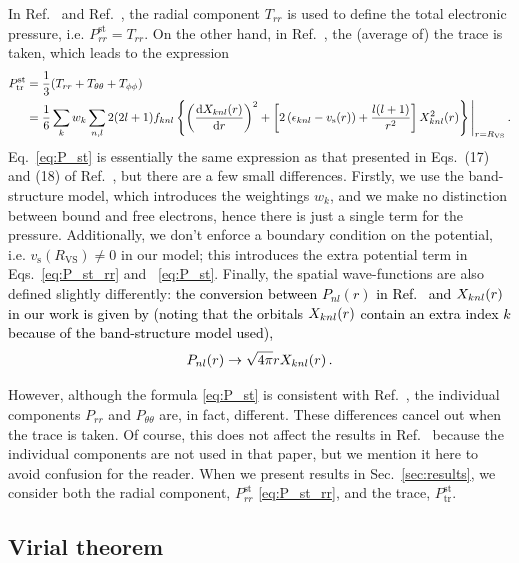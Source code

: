 \documentclass[%
 preprint,
 superscriptaddress,
 amsmath,amssymb,
longbibliography,
]{revtex4-2}
\newcommand{\vs}{v_\textrm{s}}
\newcommand{\RWS}{R_\textrm{VS}}
\newcommand{\change}[1]{\textcolor{black}{#1}}
\newcommand{\Pstrr}{P^\textrm{st}_{rr}}
\newcommand{\Psttr}{P^\textrm{st}_\textrm{tr}}
\begin{document}
In Ref.~\cite{stress_tensor_more} and Ref.~\cite{Pain_virial}, the radial component $T_{rr}$ is used to define the total electronic pressure, i.e. $\Pstrr= T_{rr}$. On the other hand, in Ref.~\cite{Pressure_warm_hot}, the (average of) the trace is taken, which leads to the expression
\begin{align}
    \Psttr &= \frac{1}{3}(T_{rr} + T_{\theta\theta} + T_{\phi\phi})\\
    \label{eq:P_st}
    &= \frac{1}{6}\sum_k w_k \sum_{n,l} 2(2l+1) f_{knl} \left\{ \left(\dv{\rnl}{r}\right)^2 + \left[2\left(\epsilon_{knl} - \vs(r) \right) +\frac{l(l+1)}{r^2}\right] X_{knl}^2 (r)\right\}\Bigg|_{r=\RWS}\,.
\end{align}
Eq.~\eqref{eq:P_st} is essentially the same expression as that presented in Eqs.~(17) and (18) of Ref.~\cite{Pressure_warm_hot}, but there are a few small differences. Firstly, we use the band-structure model, which introduces the weightings $w_k$, and we make no distinction between bound and free electrons, hence there is just a single term for the pressure. Additionally, we don't enforce a boundary condition on the potential, i.e. $\vs(\RWS)\neq0$ in our model; this introduces the extra potential term in Eqs.~\eqref{eq:P_st_rr} and ~\eqref{eq:P_st}. Finally, the spatial wave-functions are also defined slightly differently: \change{the conversion between $P_{nl}(r)$ in Ref.~\cite{Pressure_warm_hot} and $\rnl$ in our work is given by (noting that the orbitals $\rnl$ contain an extra index $k$ because of the band-structure model used),
\begin{equation}
    P_{nl}(r) \rightarrow \sqrt{4\pi} r \rnl\,.
\end{equation}}

However, although the formula \eqref{eq:P_st} is consistent with Ref.~\cite{Pressure_warm_hot}, the individual components $P_{rr}$ and $P_{\theta\theta}$ are, in fact, different. These differences cancel out when the trace is taken. Of course, this does not affect the results in Ref.~\cite{Pressure_warm_hot} because the individual components are not used in that paper, but we mention it here to avoid confusion for the reader. When we present results in Sec.~\ref{sec:results}, we consider both the radial component, $\Pstrr$ \eqref{eq:P_st_rr}, and the trace, $\Psttr$.

\subsection{Virial theorem}\label{Sec:P_vir}
\end{document}
